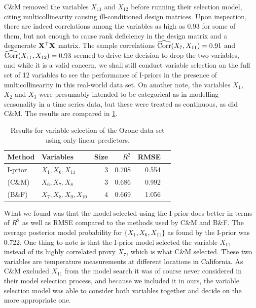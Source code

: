 \documentclass[11pt,twoside,openright]{report}
\begin{document}
C\&M removed the variables $X_{11}$ and $X_{12}$ before running their selection model, citing multicollinearity causing ill-conditioned design matrices. 
Upon inspection, there are indeed correlations among the variables as high as 0.93 for some of them, but not enough to cause rank deficiency in the design matrix and a degenerate $\mathbf X^\top \mathbf X$ matrix.
The sample correlations $\widehat{\operatorname{Corr}}(X_7,X_{11}) =0.91$ and $\widehat{\operatorname{Corr}}(X_{11},X_{12}) = 0.93$ seemed to drive the decision to drop the two variables, and while it is a valid concern, we shall still conduct variable selection on the full set of 12 variables to see the performance of I-priors in the presence of multicollinearity in this real-world data set. 
On another note, the variables $X_1$, $X_2$ and $X_3$ were presumably intended to be categorical as in modelling seasonality in a time series data, but these were treated as continuous, as did C\&M. 
The results are compared in \cref{tab:ozoneres}.

\begin{table}[htb]
\centering
\caption{Results for variable selection of the Ozone data set using only linear predictors.}
\label{tab:ozoneres}
\begin{tabular}{llrrrr}
\toprule
Method                          &Variables            &Size &$R^2$ &RMSE \\
\midrule
I-prior                         &$X_1,X_6,X_{11}$     &3    &0.708 &0.554 \\
\citeauthor{Casella2006} (C\&M) &$X_6,X_7,X_8$        &3    &0.686 &0.992 \\
\citeauthor{Breiman1985} (B\&F) &$X_7,X_8,X_9,X_{10}$ &4    &0.669 &1.056 \\
\bottomrule
\end{tabular}
\end{table}

What we found was that the model selected using the I-prior does better in terms of $R^2$ as well as RMSE compared to the methods used by C\&M and B\&F. 
The average posterior model probability for $\{X_1,X_6,X_{11}\}$ as found by the I-prior was 0.722\footnotemark. 
One thing to note is that the I-prior model selected the variable $X_{11}$ instead of its highly correlated proxy $X_7$, which is what C\&M selected.
These two variables are temperature measurements at different locations in California.
As C\&M excluded $X_{11}$ from the model search it was of course never considered in their model selection process, and because we included it in ours, the variable selection model was able to consider both variables together and decide on the more appropriate one. 
\end{document}
